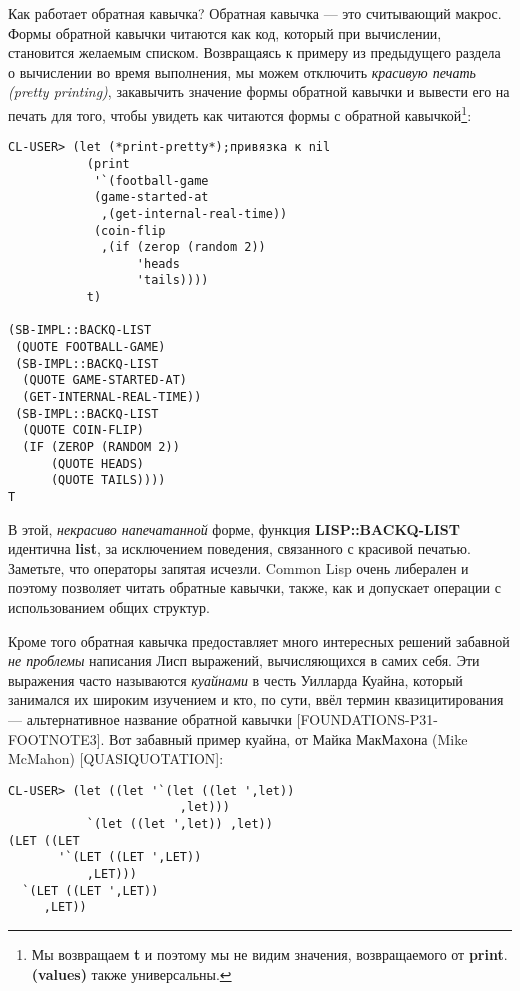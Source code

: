 Как работает обратная кавычка? Обратная кавычка --- это считывающий макрос. Формы обратной кавычки читаются как код, который при вычислении, становится желаемым списком. Возвращаясь к примеру из предыдущего раздела о вычислении во время выполнения, мы можем отключить \emph{красивую печать (pretty printing)}, закавычить значение формы обратной кавычки и вывести его на печать для того, чтобы увидеть как читаются формы с обратной кавычкой\footnote{Мы возвращаем \textbf{t} и поэтому мы не видим значения, возвращаемого от \textbf{print}. \textbf{(values)} также универсальны.}:

\begin{verbatim}
CL-USER> (let (*print-pretty*);привязка к nil
           (print
            '`(football-game
            (game-started-at
             ,(get-internal-real-time))
            (coin-flip
             ,(if (zerop (random 2))
                  'heads
                  'tails))))
           t)

(SB-IMPL::BACKQ-LIST 
 (QUOTE FOOTBALL-GAME) 
 (SB-IMPL::BACKQ-LIST 
  (QUOTE GAME-STARTED-AT) 
  (GET-INTERNAL-REAL-TIME)) 
 (SB-IMPL::BACKQ-LIST 
  (QUOTE COIN-FLIP) 
  (IF (ZEROP (RANDOM 2)) 
      (QUOTE HEADS) 
      (QUOTE TAILS)))) 
T
\end{verbatim}

В этой, \emph{некрасиво напечатанной} форме, функция {\textbf{LISP::BACKQ-LIST}} идентична \textbf{list}, за исключением поведения, связанного с красивой печатью. Заметьте, что операторы запятая исчезли. Common Lisp очень либерален и поэтому позволяет читать обратные кавычки, также, как и допускает операции с использованием общих структур.

Кроме того обратная кавычка предоставляет много интересных решений забавной \emph{не проблемы} написания Лисп выражений, вычисляющихся в самих себя. Эти выражения часто называются \emph{куайнами} в честь Уилларда Куайна, который занимался их широким изучением и кто, по сути, ввёл термин квазицитирования --- альтернативное название обратной кавычки [FOUNDATIONS-P31-FOOTNOTE3]. Вот забавный пример куайна, от Майка МакМахона (Mike McMahon) { [QUASIQUOTATION]}:

\begin{verbatim}
CL-USER> (let ((let '`(let ((let ',let))
                        ,let)))
           `(let ((let ',let)) ,let))
(LET ((LET
       '`(LET ((LET ',LET))
           ,LET)))
  `(LET ((LET ',LET))
     ,LET))
\end{verbatim}

